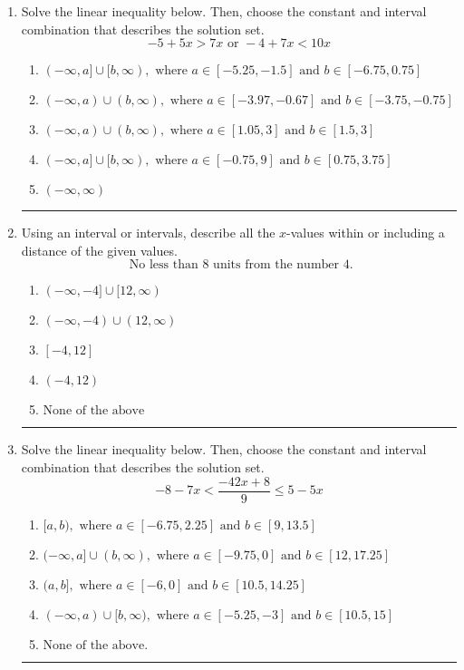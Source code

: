 \documentclass[14pt]{extbook}
\newcommand{\litem}[1]{\item#1\hspace*{-1cm}\rule{\textwidth}{0.4pt}}
\begin{document}
\begin{enumerate}
{\begin{enumerate}[label=\Alph*.]
\end{enumerate} }
\litem{
Solve the linear inequality below. Then, choose the constant and interval combination that describes the solution set.\[ -5 + 5 x > 7 x \text{ or } -4 + 7 x < 10 x \]\begin{enumerate}[label=\Alph*.]
\item \( (-\infty, a] \cup [b, \infty), \text{ where } a \in [-5.25, -1.5] \text{ and } b \in [-6.75, 0.75] \)
\item \( (-\infty, a) \cup (b, \infty), \text{ where } a \in [-3.97, -0.67] \text{ and } b \in [-3.75, -0.75] \)
\item \( (-\infty, a) \cup (b, \infty), \text{ where } a \in [1.05, 3] \text{ and } b \in [1.5, 3] \)
\item \( (-\infty, a] \cup [b, \infty), \text{ where } a \in [-0.75, 9] \text{ and } b \in [0.75, 3.75] \)
\item \( (-\infty, \infty) \)

\end{enumerate} }
\litem{
Using an interval or intervals, describe all the $x$-values within or including a distance of the given values.\[ \text{ No less than } 8 \text{ units from the number } 4. \]\begin{enumerate}[label=\Alph*.]
\item \( (-\infty, -4] \cup [12, \infty) \)
\item \( (-\infty, -4) \cup (12, \infty) \)
\item \( [-4, 12] \)
\item \( (-4, 12) \)
\item \( \text{None of the above} \)

\end{enumerate} }
\litem{
Solve the linear inequality below. Then, choose the constant and interval combination that describes the solution set.\[ -8 - 7 x < \frac{-42 x + 8}{9} \leq 5 - 5 x \]\begin{enumerate}[label=\Alph*.]
\item \( [a, b), \text{ where } a \in [-6.75, 2.25] \text{ and } b \in [9, 13.5] \)
\item \( (-\infty, a] \cup (b, \infty), \text{ where } a \in [-9.75, 0] \text{ and } b \in [12, 17.25] \)
\item \( (a, b], \text{ where } a \in [-6, 0] \text{ and } b \in [10.5, 14.25] \)
\item \( (-\infty, a) \cup [b, \infty), \text{ where } a \in [-5.25, -3] \text{ and } b \in [10.5, 15] \)
\item \( \text{None of the above.} \)


\end{enumerate}}
\end{enumerate}
\end{document}
